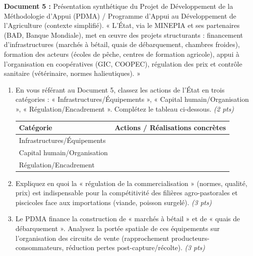 \documentclass[11pt]{article}
\begin{document}
\begin{exercice}
\textbf{Document 5 :} Présentation synthétique du Projet de Développement de la Méthodologie d'Appui (PDMA) / Programme d'Appui au Développement de l'Agriculture (contexte simplifié).
« L'État, via le MINEPIA et ses partenaires (BAD, Banque Mondiale), met en œuvre des projets structurants : financement d'infrastructures (marchés à bétail, quais de débarquement, chambres froides), formation des acteurs (écoles de pêche, centres de formation agricole), appui à l'organisation en coopératives (GIC, COOPEC), régulation des prix et contrôle sanitaire (vétérinaire, normes halieutiques). »

\begin{enumerate}
    \item En vous référant au Document 5, classez les actions de l'État en trois catégories : « Infrastructures/Équipements », « Capital humain/Organisation », « Régulation/Encadrement ». Complétez le tableau ci-dessous. \textit{(2 pts)}
    
    \begin{tabular}{l|p{6cm}}
    \toprule
    \textbf{Catégorie} & \textbf{Actions / Réalisations concrètes} \\
    \midrule
    Infrastructures/Équipements & \\
    Capital humain/Organisation & \\
    Régulation/Encadrement & \\
    \bottomrule
    \end{tabular}

    \item Expliquez en quoi la « régulation de la commercialisation » (normes, qualité, prix) est indispensable pour la compétitivité des filières agro-pastorales et piscicoles face aux importations (viande, poisson surgelé). \textit{(3 pts)}
    \item Le PDMA finance la construction de « marchés à bétail » et de « quais de débarquement ». Analysez la portée spatiale de ces équipements sur l'organisation des circuits de vente (rapprochement producteurs-consommateurs, réduction pertes post-capture/récolte). \textit{(3 pts)}
\end{enumerate}
\end{exercice}
\end{document}
